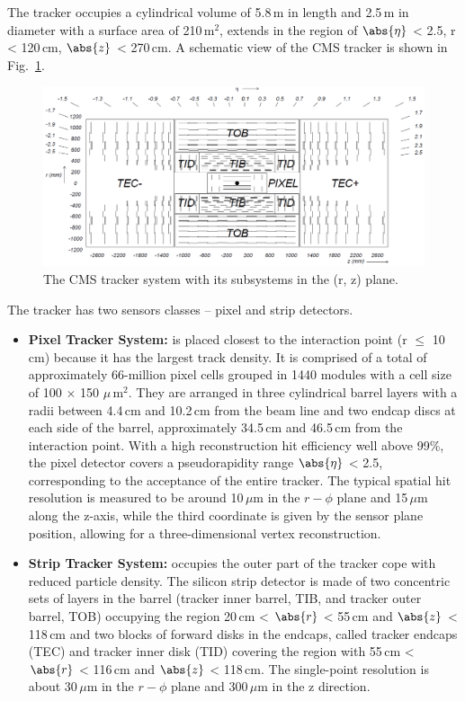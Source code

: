 The tracker occupies a cylindrical volume of 5.8\,m in length and 2.5\,m in diameter with a surface area of 210\,m$^{2}$, extends in the region of $\abs{\eta}$ < 2.5, r < 120\,cm, $\abs{z}$ < 270\,cm. A schematic view of the CMS tracker is shown in Fig.~\ref{fig:tracker}. 

\begin{figure}[h!]
\centering
\includegraphics[scale=0.3]{fig/lhc/Tracker.png}
\caption{\label{fig:tracker} The CMS tracker system with its subsystems in the (r, z) plane.}
\end{figure}
The tracker has two sensors classes – pixel and strip detectors.
\begin{itemize}
\item{\textbf{Pixel Tracker System:}} is placed closest to the interaction point (r $\leq$ 10\,cm) because it has the largest track density. It is comprised of a total of approximately 66-million pixel cells grouped in 1440 modules with a cell size of 100 $\times$ 150 $\mu$\,m$^{2}$. They are arranged in three cylindrical barrel layers with a radii between 4.4\,cm and 10.2\,cm from the beam line and two endcap discs at each side of the barrel, approximately 34.5\,cm and 46.5\,cm from the interaction point. With a high reconstruction hit efficiency well above 99\%, the pixel detector covers a pseudorapidity range $\abs{\eta}$ < 2.5, corresponding to the acceptance of the entire tracker. The typical spatial hit resolution is measured to be around 10\,$\mu$m in the $r-\phi$ plane and 15\,$\mu$m along the z-axis, while the third coordinate is given by the sensor plane position, allowing for a three-dimensional vertex reconstruction.
\item{\textbf{Strip Tracker System:}} occupies the outer part of the tracker cope with reduced particle density. The silicon strip detector is made of two concentric sets of layers in the barrel (tracker inner barrel, TIB, and tracker outer barrel, TOB) occupying the region 20\,cm < $\abs{r}$ < 55\,cm and $\abs{z}$ < 118\,cm and two blocks of forward disks in the endcaps, called tracker endcaps (TEC) and tracker inner disk (TID) covering the region with 55\,cm < $\abs{r}$ < 116\,cm and $\abs{z}$ < 118\,cm. The single-point resolution is about 30\,$\mu$m in the $r-\phi$ plane and 300\,$\mu$m in the z direction.
\end{itemize} 


